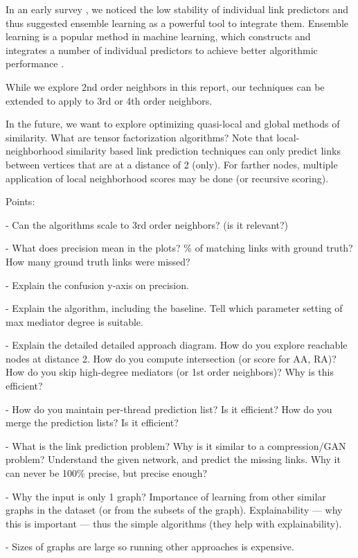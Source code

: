 In an early survey \cite{lu2011link}, we noticed the low stability of individual link predictors and thus suggested ensemble learning as a powerful tool to integrate them. Ensemble learning is a popular method in machine learning, which constructs and integrates a number of individual predictors to achieve better algorithmic performance \cite{zhou2012ensemble}.

While we explore 2nd order neighbors in this report, our techniques can be extended to apply to 3rd or 4th order neighbors.

In the future, we want to explore optimizing quasi-local and global methods of similarity. What are tensor factorization algorithms? Note that local-neighborhood similarity based link prediction techniques can only predict links between vertices that are at a distance of 2 (only). For farther nodes, multiple application of local neighborhood scores may be done (or recursive scoring).


Points:

- Can the algorithms scale to 3rd order neighbors? (is it relevant?)

- What does precision mean in the plots? \% of matching links with ground truth? How many ground truth links were missed?

- Explain the confusion y-axis on precision.

- Explain the algorithm, including the baseline. Tell which parameter setting of max mediator degree is suitable.

- Explain the detailed detailed approach diagram. How do you explore reachable nodes at distance 2. How do you compute intersection (or score for AA, RA)? How do you skip high-degree mediators (or 1st order neighbors)? Why is this efficient?

- How do you maintain per-thread prediction list? Is it efficient? How do you merge the prediction lists? Is it efficient?

- What is the link prediction problem? Why is it similar to a compression/GAN problem? Understand the given network, and predict the missing links. Why it can never be 100\% precise, but precise enough?

- Why the input is only 1 graph? Importance of learning from other similar graphs in the dataset (or from the subsets of the graph). Explainability --- why this is important --- thus the simple algorithms (they help with explainability).

- Sizes of graphs are large so running other approaches is expensive.

